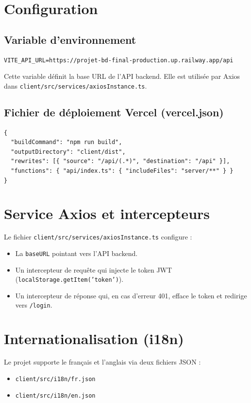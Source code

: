 \documentclass[12pt,a4paper]{report}
\begin{document}
\section{Configuration}

\subsection{Variable d'environnement}
\begin{lstlisting}
VITE_API_URL=https://projet-bd-final-production.up.railway.app/api
\end{lstlisting}
Cette variable définit la base URL de l'API backend. Elle est utilisée par Axios dans \texttt{client/src/services/axiosInstance.ts}.

\subsection{Fichier de déploiement Vercel (vercel.json)}
\begin{lstlisting}
{
  "buildCommand": "npm run build",
  "outputDirectory": "client/dist",
  "rewrites": [{ "source": "/api/(.*)", "destination": "/api" }],
  "functions": { "api/index.ts": { "includeFiles": "server/**" } }
}
\end{lstlisting}

\section{Service Axios et intercepteurs}

Le fichier \texttt{client/src/services/axiosInstance.ts} configure :
\begin{itemize}
    \item La \texttt{baseURL} pointant vers l'API backend.
    \item Un intercepteur de requête qui injecte le token JWT (\texttt{localStorage.getItem('token')}).
    \item Un intercepteur de réponse qui, en cas d'erreur 401, efface le token et redirige vers \texttt{/login}.
\end{itemize}

\section{Internationalisation (i18n)}

Le projet supporte le français et l'anglais via deux fichiers JSON :
\begin{itemize}
    \item \texttt{client/src/i18n/fr.json}
    \item \texttt{client/src/i18n/en.json}
\end{itemize}
\end{document}
